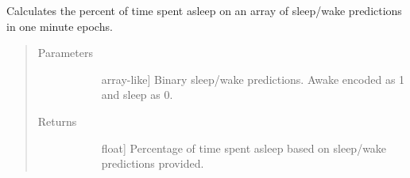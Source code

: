 \documentclass[letterpaper,10pt,english]{sphinxmanual}
\begin{document}
\begin{fulllineitems}
\label{\detokenize{index:sleeppy.utils.percent_time_asleep}}
Calculates the percent of time spent asleep on an array of sleep/wake predictions in one minute epochs.
\begin{quote}\begin{description}
\item[{Parameters}] \leavevmode\begin{description}
\item[{}] \leavevmode{[}array-like{]}
Binary sleep/wake predictions. Awake encoded as 1 and sleep as 0.

\end{description}

\item[{Returns}] \leavevmode\begin{description}
\item[{}] \leavevmode{[}float{]}
Percentage of time spent asleep based on sleep/wake predictions provided.

\end{description}

\end{description}\end{quote}

\end{fulllineitems}

\end{document}
